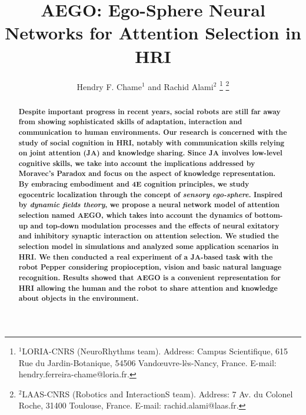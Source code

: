 \documentclass[letterpaper, 10 pt, conference]{ieeeconf}  %
\title{\LARGE \bf
	AEGO: Ego-Sphere Neural Networks for Attention Selection in HRI 
}
\author{Hendry F. Chame$^{1}$ and Rachid Alami$^{2}$%
	\thanks{$^{1}$LORIA-CNRS (NeuroRhythms team). Address: Campus Scientifique, 615 Rue du Jardin-Botanique, 54506 Vand\oe uvre-l\`es-Nancy, France.
		{\small E-mail: hendry.ferreira-chame@loria.fr}.}%
	\thanks{$^{2}$LAAS-CNRS (Robotics and InteractionS team). Address: 7 Av. du Colonel Roche, 31400 Toulouse, France.
		{\small E-mail: rachid.alami@laas.fr}.}%
}
\begin{document}
		
	
	\maketitle
	\thispagestyle{empty}
	\pagestyle{empty}
	
	
	\begin{abstract}
		
		
		\small \bf Despite important progress in recent years, social robots are still far away from showing sophisticated skills of adaptation, interaction and communication to human environments. Our research is concerned with the study of social cognition in HRI, notably with communication skills relying on joint attention (JA) and knowledge sharing. Since JA involves low-level cognitive skills, we take into account the implications addressed by Moravec's Paradox and focus on the aspect of knowledge representation. By embracing embodiment and 4E cognition principles, we study egocentric localization through the concept of \textit{sensory ego-sphere}. Inspired by \textit{dynamic fields theory}, we	propose a neural network model of attention selection named AEGO, which takes into account the dynamics of bottom-up and top-down modulation processes and the effects of neural exitatory and inhibitory synaptic interaction on attention selection. We studied the selection model in simulations and analyzed some application scenarios in HRI. We then conducted a real experiment of a JA-based task with the robot Pepper considering propioception, vision and basic natural language recognition. Results showed that AEGO is a convenient representation for HRI allowing the human and the robot to share attention and knowledge about objects in the environment.
		

\end{abstract}
\end{document}
